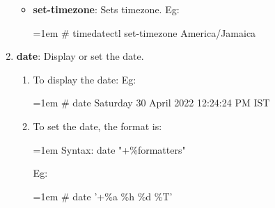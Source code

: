 \begin{flushleft}
\begin{enumerate}
\begin{itemize}
\begin{tcolorbox}[breakable,notitle,boxrule=-0pt,colback=black,colframe=black]
			\end{tcolorbox}
			\item \textbf{set-timezone}: Sets timezone.
			\newline
			Eg:
			\begin{tcolorbox}[breakable,notitle,boxrule=-0pt,colback=black,colframe=black]
				\color{green}
				\font=1em
				\# timedatectl set-timezone America/Jamaica
				\font=4pt
			\end{tcolorbox}
		\end{itemize}	
		\bigskip
		\bigskip
		\item \textbf{date}: Display or set the date.
		\begin{enumerate}[label=(\alph*)]
			\item To display the date:
			\newline
			Eg:
			\begin{tcolorbox}[breakable,notitle,boxrule=-0pt,colback=black,colframe=black]
				\color{green}
				\font=1em
				\# date
				\newline
				\color{white}
				Saturday 30 April 2022 12:24:24 PM IST
				\font=4pt
			\end{tcolorbox}
			\item To set the date, the format is:
			\bigskip
			\begin{tcolorbox}[breakable,notitle,boxrule=1pt,colback=pink,colframe=pink]
				\color{black}
				\font=1em
				Syntax: date "+\%formatters"
				\font=4pt
			\end{tcolorbox}
			Eg:
			\bigskip
			\begin{tcolorbox}[breakable,notitle,boxrule=-0pt,colback=black,colframe=black]
				\color{green}
				\font=1em
				\# date '+\%a \%h \%d \%T'
				\font=4pt
			\end{tcolorbox}
		

\end{enumerate}
\end{enumerate}
\end{flushleft}
